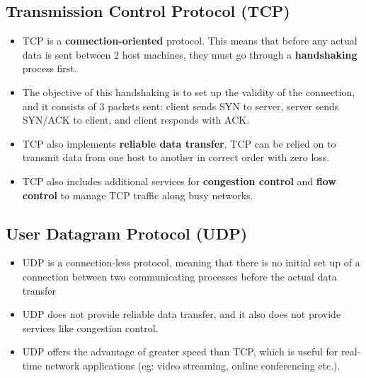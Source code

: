 \documentclass{article}
\theoremstyle{plain}
\theoremstyle{definition}
\begin{document}
\subsection{Transmission Control Protocol (TCP)}
\begin{itemize}
    \item TCP is a \textbf{connection-oriented} protocol. This means that before any actual data is sent between 2 host machines, they must go through a \textbf{handshaking} process first.
    
    \item The objective of this handshaking is to set up the validity of the connection, and it consists of 3 packets sent: client sends SYN to server, server sends SYN/ACK to client, and client responds with ACK.
    
    \item TCP also implements \textbf{reliable data transfer}. TCP can be relied on to transmit data from one host to another in correct order with zero loss. 
    
    \item TCP also includes additional services for \textbf{congestion control} and \textbf{flow control} to manage TCP traffic along busy networks. 
\end{itemize}

\subsection{User Datagram Protocol (UDP)}
\begin{itemize}
    \item UDP is a connection-less protocol, meaning that there is no initial set up of a connection between two communicating processes before the actual data transfer
    
    \item UDP does not provide reliable data transfer, and it also does not provide services like congestion control.
    
    \item UDP offers the advantage of greater speed than TCP, which is useful for real-time network applications (eg: video streaming, online conferencing etc.).
\end{itemize}
\end{document}

